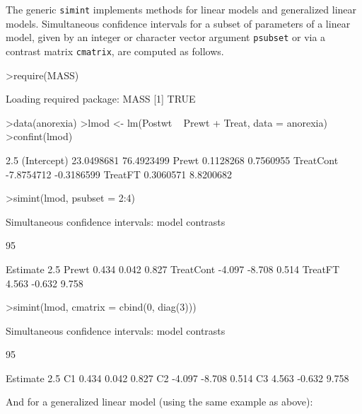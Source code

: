 \documentclass{article}
\begin{document}
The generic \texttt{simint} implements methods for linear models and
generalized linear models. Simultaneous confidence intervals for a subset
of parameters of a linear model, given by an integer or character vector
argument \texttt{psubset} or via a contrast matrix \texttt{cmatrix}, 
are computed as follows.
\small
\begin{Schunk}
\begin{Sinput}
>require(MASS)
\end{Sinput}
\begin{Soutput}
Loading required package: MASS 
[1] TRUE
\end{Soutput}
\begin{Sinput}
>data(anorexia)
>lmod <- lm(Postwt ~ Prewt + Treat, data = anorexia)
>confint(lmod)
\end{Sinput}
\begin{Soutput}
                 2.5 %     97.5 %
(Intercept) 23.0498681 76.4923499
Prewt        0.1128268  0.7560955
TreatCont   -7.8754712 -0.3186599
TreatFT      0.3060571  8.8200682
\end{Soutput}
\begin{Sinput}
>simint(lmod, psubset = 2:4)
\end{Sinput}
\begin{Soutput}
	Simultaneous confidence intervals: model contrasts

	95 % confidence intervals

          Estimate  2.5 % 97.5 %
Prewt        0.434  0.042  0.827
TreatCont   -4.097 -8.708  0.514
TreatFT      4.563 -0.632  9.758
\end{Soutput}
\begin{Sinput}
>simint(lmod, cmatrix = cbind(0, diag(3)))
\end{Sinput}
\begin{Soutput}
	Simultaneous confidence intervals: model contrasts

	95 % confidence intervals

   Estimate  2.5 % 97.5 %
C1    0.434  0.042  0.827
C2   -4.097 -8.708  0.514
C3    4.563 -0.632  9.758
\end{Soutput}
\end{Schunk}
\normalsize
And for a generalized linear model (using the same example as above):
\small
\end{document}
